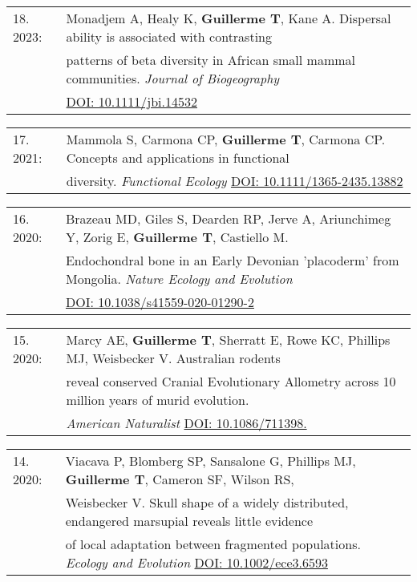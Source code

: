 \documentclass[10pt,a4paper]{article}
\begin{document}
{\begin{tabular}{ll}
18. 2023: & Monadjem A, Healy K, \textbf{Guillerme T}, Kane A. Dispersal ability is associated with contrasting\\
      & patterns of beta diversity in African small mammal communities. \textit{Journal of Biogeography}\\
      & \href{https://onlinelibrary.wiley.com/doi/10.1111/jbi.14532}{DOI: 10.1111/jbi.14532 }\\
\end{tabular}
\bigskip

\begin{tabular}{ll}
17. 2021: & Mammola S, Carmona CP, \textbf{Guillerme T}, Carmona CP. Concepts and applications in functional\\
      & diversity. \textit{Functional Ecology} \href{https://besjournals.onlinelibrary.wiley.com/doi/10.1111/1365-2435.13882}{DOI: 10.1111/1365-2435.13882}\\
\end{tabular}
\bigskip

\begin{tabular}{ll}
16. 2020: & Brazeau MD, Giles S, Dearden RP, Jerve A, Ariunchimeg Y, Zorig E, \textbf{Guillerme T}, Castiello M.\\
      & Endochondral bone in an Early Devonian 'placoderm' from Mongolia. \textit{Nature Ecology and Evolution}\\
      & \href{https://www.nature.com/articles/s41559-020-01290-2}{DOI: 10.1038/s41559-020-01290-2}\\
\end{tabular}
\bigskip

\begin{tabular}{ll}
15. 2020: & Marcy AE, \textbf{Guillerme T}, Sherratt E, Rowe KC, Phillips MJ, Weisbecker V. Australian rodents\\
      & reveal conserved Cranial Evolutionary Allometry across 10 million years of murid evolution.\\
      & \textit{American Naturalist} \href{https://www.journals.uchicago.edu/doi/abs/10.1086/711398?journalCode=an}{DOI: 10.1086/711398.}\\
\end{tabular}
\bigskip

\begin{tabular}{ll}
14. 2020: & Viacava P, Blomberg SP, Sansalone G, Phillips MJ, \textbf{Guillerme T}, Cameron SF, Wilson RS,\\
      & Weisbecker V. Skull shape of a widely distributed, endangered marsupial reveals little evidence\\
      & of local adaptation between fragmented populations. \textit{Ecology and Evolution} \href{https://onlinelibrary.wiley.com/doi/full/10.1002/ece3.6593}{DOI: 10.1002/ece3.6593}\\
\end{tabular}
\bigskip

}
\end{document}
